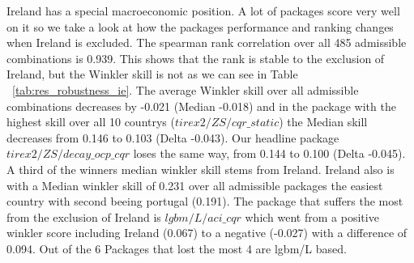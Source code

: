Ireland has a special macroeconomic position. A lot of packages score very well on it so we take a look at how the packages performance and ranking changes when Ireland is excluded. The spearman rank correlation over all 485 admissible combinations is 0.939. This shows that the rank is stable to the exclusion of Ireland, but the Winkler skill is not as we can see in Table ~\ref{tab:res_robustness_ie}. The average Winkler skill over all admissible combinations decreases by -0.021 (Median -0.018) and in the package with the highest skill over all 10 countrys ($tirex2/ZS/cqr\_static$) the Median skill decreases from 0.146 to 0.103 (Delta -0.043). Our headline package $tirex2/ZS/decay\_ocp\_cqr$ loses the same way, from 0.144 to 0.100 (Delta -0.045). A third of the winners median winkler skill stems from Ireland. Ireland also is with a Median winkler skill of 0.231 over all admissible packages the easiest country with second beeing portugal (0.191). The package that suffers the most from the exclusion of Ireland is $lgbm/L/aci\_cqr$ which went from a positive winkler score including Ireland (0.067) to a negative (-0.027) with a difference of 0.094. Out of the 6 Packages that lost the most 4 are lgbm/L based.\\
